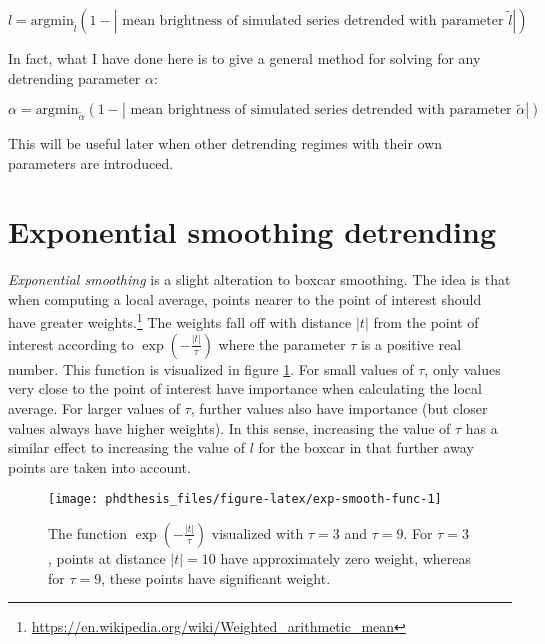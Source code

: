 \documentclass[12pt,]{book}
\let\rmarkdownfootnote\footnote%
\def\footnote{\protect\rmarkdownfootnote}
\theoremstyle{definition}
\theoremstyle{definition}
\theoremstyle{definition}
\theoremstyle{remark}
\begin{document}
\begin{equation}
l = \text{argmin}_{\tilde{l}} (1 - |\text{ mean brightness of simulated series detrended with parameter } \tilde{l}|)
\label{eq:leq}
\end{equation}

In fact, what I have done here is to give a general method for solving
for any detrending parameter \(\alpha\):

\begin{equation}
\alpha = \text{argmin}_{\tilde{\alpha}} (1 - |\text{ mean brightness of simulated series detrended with parameter } \tilde{\alpha}|)
\label{eq:detrend-param}
\end{equation}

This will be useful later when other detrending regimes with their own
parameters are introduced.

\section{Exponential smoothing
detrending}\label{exponential-smoothing-detrending}

\emph{Exponential smoothing} is a slight alteration to boxcar smoothing.
The idea is that when computing a local average, points nearer to the
point of interest should have greater weights.\footnote{\url{https://en.wikipedia.org/wiki/Weighted_arithmetic_mean}}
The weights fall off with distance \(|t|\) from the point of interest
according to \(\exp(-\frac{|t|}{\tau})\) where the parameter \(\tau\) is
a positive real number. This function is visualized in figure
\ref{fig:exp-smooth-func}. For small values of \(\tau\), only values
very close to the point of interest have importance when calculating the
local average. For larger values of \(\tau\), further values also have
importance (but closer values always have higher weights). In this
sense, increasing the value of \(\tau\) has a similar effect to
increasing the value of \(l\) for the boxcar in that further away points
are taken into account.






\begin{figure}

\texttt{[image: phdthesis\_files/figure-latex/exp-smooth-func-1]} \hfill{}

\caption{The function \(\exp(-\frac{|t|}{\tau})\)
visualized with \(\tau = 3\) and \(\tau = 9\). For \(\tau = 3\), points
at distance \(|t| = 10\) have approximately zero weight, whereas for
\(\tau = 9\), these points have significant weight.}\label{fig:exp-smooth-func}
\end{figure}
\end{document}
